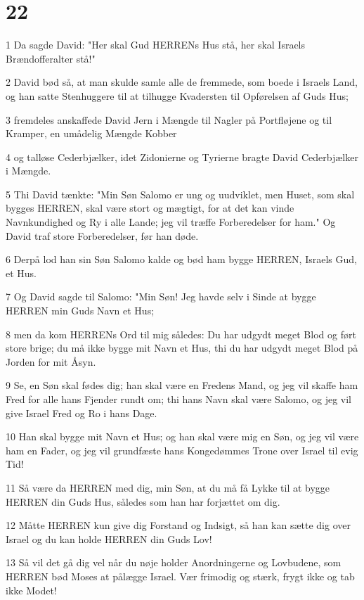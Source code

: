 \chapter{22}

\par 1 Da sagde David: "Her skal Gud HERRENs Hus stå, her skal Israels Brændofferalter stå!"
\par 2 David bød så, at man skulde samle alle de fremmede, som boede i Israels Land, og han satte Stenhuggere til at tilhugge Kvadersten til Opførelsen af Guds Hus;
\par 3 fremdeles anskaffede David Jern i Mængde til Nagler på Portfløjene og til Kramper, en umådelig Mængde Kobber
\par 4 og talløse Cederbjælker, idet Zidonierne og Tyrierne bragte David Cederbjælker i Mængde.
\par 5 Thi David tænkte: "Min Søn Salomo er ung og uudviklet, men Huset, som skal bygges HERREN, skal være stort og mægtigt, for at det kan vinde Navnkundighed og Ry i alle Lande; jeg vil træffe Forberedelser for ham." Og David traf store Forberedelser, før han døde.
\par 6 Derpå lod han sin Søn Salomo kalde og bød ham bygge HERREN, Israels Gud, et Hus.
\par 7 Og David sagde til Salomo: "Min Søn! Jeg havde selv i Sinde at bygge HERREN min Guds Navn et Hus;
\par 8 men da kom HERRENs Ord til mig således: Du har udgydt meget Blod og ført store brige; du må ikke bygge mit Navn et Hus, thi du har udgydt meget Blod på Jorden for mit Åsyn.
\par 9 Se, en Søn skal fødes dig; han skal være en Fredens Mand, og jeg vil skaffe ham Fred for alle hans Fjender rundt om; thi hans Navn skal være Salomo, og jeg vil give Israel Fred og Ro i hans Dage.
\par 10 Han skal bygge mit Navn et Hus; og han skal være mig en Søn, og jeg vil være ham en Fader, og jeg vil grundfæste hans Kongedømmes Trone over Israel til evig Tid!
\par 11 Så være da HERREN med dig, min Søn, at du må få Lykke til at bygge HERREN din Guds Hus, således som han har forjættet om dig.
\par 12 Måtte HERREN kun give dig Forstand og Indsigt, så han kan sætte dig over Israel og du kan holde HERREN din Guds Lov!
\par 13 Så vil det gå dig vel når du nøje holder Anordningerne og Lovbudene, som HERREN bød Moses at pålægge Israel. Vær frimodig og stærk, frygt ikke og tab ikke Modet!
